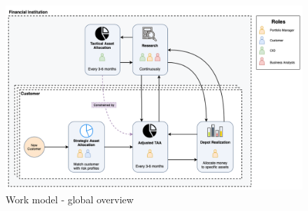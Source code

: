 \begin{figure}[h!]
  \centering
  \includegraphics[scale=0.35]{img/work_model_process.png}
  \caption{Work model - global overview}
\end{figure}


